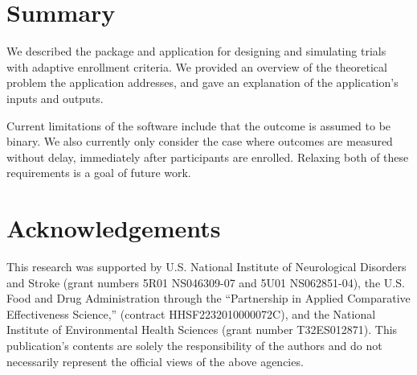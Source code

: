 \documentclass[article]{jss}
\begin{document}
\section*{Summary}
\label{sec:Summary}

We described the   package and  application for designing and simulating trials with adaptive enrollment criteria. We provided an overview of the theoretical problem the application addresses, and gave an explanation of the application's inputs and outputs.

Current limitations of the software include that the outcome is assumed to be binary. We also currently only consider the case where outcomes are measured without delay, immediately after participants are enrolled. Relaxing both of these requirements is a goal of future work.


\section*{Acknowledgements}
\label{sec:acknowledgements}
This research was supported by U.S. National Institute of Neurological Disorders and Stroke (grant numbers 5R01 NS046309-07 and 5U01 NS062851-04), the U.S. Food and Drug Administration through the ``Partnership in Applied Comparative Effectiveness Science,'' (contract HHSF2232010000072C), and the National Institute of Environmental Health Sciences (grant number T32ES012871). This publication's contents are solely the responsibility of the authors and do not necessarily represent the official views of the above agencies.


%
 
\end{document}
